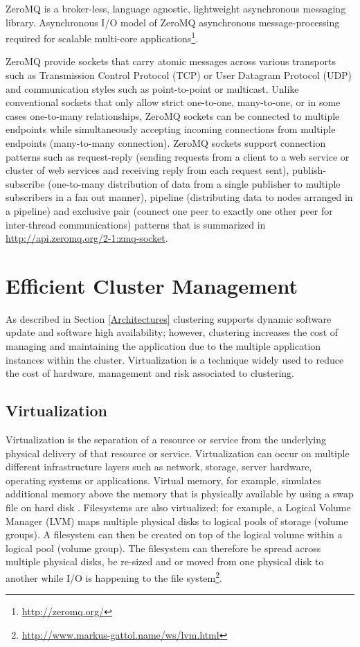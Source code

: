 \documentclass[a4paper,11pt,twoside]{report}
\begin{document}
ZeroMQ is a broker-less, language agnostic, lightweight asynchronous messaging library. Asynchronous I/O model of ZeroMQ asynchronous message-processing required for scalable multi-core applications\footnote{\label{ZeroMQ_2} \url{http://zeromq.org/}}. 

ZeroMQ provide sockets that carry atomic messages across various transports such as Transmission Control Protocol (TCP) or User Datagram Protocol (UDP) and communication styles such as point-to-point or multicast. Unlike conventional sockets that only allow strict one-to-one, many-to-one, or in some cases one-to-many relationships, ZeroMQ sockets can be connected to multiple endpoints while simultaneously accepting incoming connections from multiple endpoints (many-to-many connection). ZeroMQ sockets support connection patterns such as request-reply (sending requests from a client to a web service or cluster of web services and receiving reply from each request sent), publish-subscribe (one-to-many distribution of data from a single publisher to multiple subscribers in a fan out manner), pipeline (distributing data to nodes arranged in a pipeline) and exclusive pair (connect one peer to exactly one other peer for inter-thread communications) patterns that is summarized in \url{http://api.zeromq.org/2-1:zmq-socket}.      

\clearpage

\section{Efficient Cluster Management} 
As described in Section \ref{Architectures} clustering supports dynamic software update and software high availability; however, clustering increases the cost of managing and maintaining the application due to the multiple application instances within the cluster. Virtualization is a technique widely used to reduce the cost of hardware, management and risk associated to clustering.

\subsection{Virtualization} 
Virtualization is the separation of a resource or service from the underlying physical delivery of that resource or service. Virtualization can occur on multiple different infrastructure layers such as network, storage, server hardware, operating systems or applications. Virtual memory, for example, simulates additional memory above the memory that is physically available by using a swap file on hard disk \cite{virtualization}. Filesystems are also virtualized; for example, a Logical Volume Manager (LVM) maps multiple physical disks to logical pools of storage (volume groups). A filesystem can then be created on top of the logical volume within a logical pool (volume group). The filesystem can therefore be spread across multiple physical disks, be re-sized and or moved from one physical disk to another while I/O is happening to the file system\footnote{ \url {http://www.markus-gattol.name/ws/lvm.html}}. 
\end{document}
